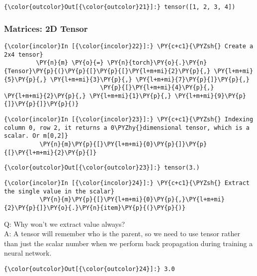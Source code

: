 \begin{Verbatim}[commandchars=\\\{\}]
{\color{outcolor}Out[{\color{outcolor}21}]:} tensor([1, 2, 3, 4])
\end{Verbatim}
\subsubsection{Matrices: 2D Tensor}
\begin{Verbatim}[commandchars=\\\{\}]
{\color{incolor}In [{\color{incolor}22}]:} \PY{c+c1}{\PYZsh{} Create a 2x4 tensor}
         \PY{n}{m} \PY{o}{=} \PY{n}{torch}\PY{o}{.}\PY{n}{Tensor}\PY{p}{(}\PY{p}{[}\PY{p}{[}\PY{l+m+mi}{2}\PY{p}{,} \PY{l+m+mi}{5}\PY{p}{,} \PY{l+m+mi}{3}\PY{p}{,} \PY{l+m+mi}{7}\PY{p}{]}\PY{p}{,}
                           \PY{p}{[}\PY{l+m+mi}{4}\PY{p}{,} \PY{l+m+mi}{2}\PY{p}{,} \PY{l+m+mi}{1}\PY{p}{,} \PY{l+m+mi}{9}\PY{p}{]}\PY{p}{]}\PY{p}{)} 
\end{Verbatim}
            
\begin{Verbatim}[commandchars=\\\{\}]
{\color{incolor}In [{\color{incolor}23}]:} \PY{c+c1}{\PYZsh{} Indexing column 0, row 2, it returns a 0\PYZhy{}dimensional tensor, which is a scalar. Or m[0,2]}
          \PY{n}{m}\PY{p}{[}\PY{l+m+mi}{0}\PY{p}{]}\PY{p}{[}\PY{l+m+mi}{2}\PY{p}{]} 
\end{Verbatim}


\begin{Verbatim}[commandchars=\\\{\}]
{\color{outcolor}Out[{\color{outcolor}23}]:} tensor(3.)
\end{Verbatim}
            
\begin{Verbatim}[commandchars=\\\{\}]
{\color{incolor}In [{\color{incolor}24}]:} \PY{c+c1}{\PYZsh{} Extract the single value in the scalar}
          \PY{n}{m}\PY{p}{[}\PY{l+m+mi}{0}\PY{p}{,}\PY{l+m+mi}{2}\PY{p}{]}\PY{o}{.}\PY{n}{item}\PY{p}{(}\PY{p}{)} 
\end{Verbatim}
Q: Why won't we extract value always? \\
A: A tensor will remember who is the parent, so we need to use tensor rather than just the scalar number when we perform back propagation during training a neural network.

\begin{Verbatim}[commandchars=\\\{\}]
{\color{outcolor}Out[{\color{outcolor}24}]:} 3.0
\end{Verbatim}
            

